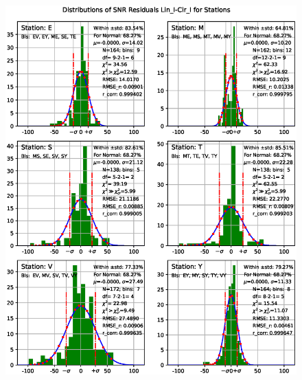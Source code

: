 \documentclass[letterpaper,twoside,12pt]{article}
\begin{document}
\begin{figure}[ht!]
  \begin{center}
  \includegraphics[width=33pc]{Distr_SNR_Lin_I-Cir_I_Diff_Stations.eps}
  \caption{\small }
  \label{dsnr_distr_st}
  \end{center}
\end{figure}
\end{document}

